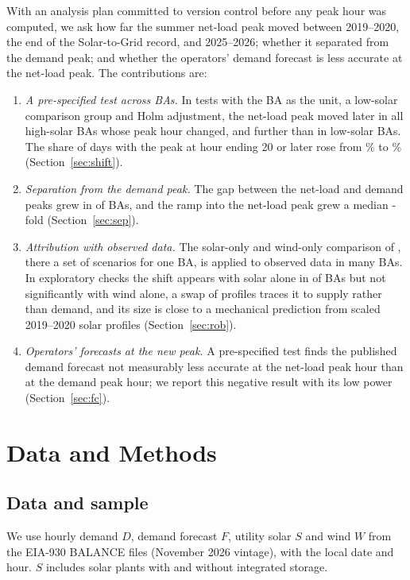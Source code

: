 \documentclass[conference,a4paper]{IEEEtran}
\begin{document}
With an analysis plan committed to version control before any peak hour was computed, we ask how far the summer net-load peak moved between 2019--2020, the end of the Solar-to-Grid record, and 2025--2026; whether it separated from the demand peak; and whether the operators' demand forecast is less accurate at the net-load peak. The contributions are:
\begin{enumerate}
\item \emph{A pre-specified test across BAs.} In tests with the BA as the unit, a low-solar comparison group and Holm adjustment, the net-load peak moved later in all  high-solar BAs whose peak hour changed, and further than in low-solar BAs. The share of days with the peak at hour ending 20 or later rose from \% to \% (Section~\ref{sec:shift}).
\item \emph{Separation from the demand peak.} The gap between the net-load and demand peaks grew in  of  BAs, and the ramp into the net-load peak grew a median -fold (Section~\ref{sec:sep}).
\item \emph{Attribution with observed data.} The solar-only and wind-only comparison of \cite{lave2016comparison}, there a set of scenarios for one BA, is applied to observed data in many BAs. In exploratory checks the shift appears with solar alone in  of  BAs but not significantly with wind alone, a swap of profiles traces it to supply rather than demand, and its size is close to a mechanical prediction from scaled 2019--2020 solar profiles (Section~\ref{sec:rob}).
\item \emph{Operators' forecasts at the new peak.} A pre-specified test finds the published demand forecast not measurably less accurate at the net-load peak hour than at the demand peak hour; we report this negative result with its low power (Section~\ref{sec:fc}).
\end{enumerate}

\section{Data and Methods}

\subsection{Data and sample}
We use hourly demand $D$, demand forecast $F$, utility solar $S$ and wind $W$ from the EIA-930 BALANCE files (November 2026 vintage), with the local date and hour. $S$ includes solar plants with and without integrated storage.
\end{document}
